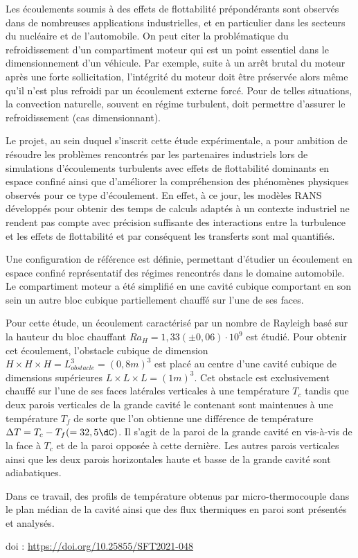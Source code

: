 {\normalsize
Les écoulements  soumis à des effets de flottabilité prépondérants sont observés dans de nombreuses applications industrielles, et en particulier dans les secteurs du nucléaire et de l'automobile. On peut citer la problématique du refroidissement d'un compartiment moteur qui est un point essentiel dans le dimensionnement d'un véhicule. Par exemple, suite à un arrêt brutal du moteur après une forte sollicitation, l'intégrité du moteur doit être préservée alors même qu'il n'est plus refroidi par un écoulement externe forcé. Pour de telles situations, la convection naturelle, souvent en régime turbulent, doit permettre d'assurer le refroidissement (cas dimensionnant).



Le projet, au sein duquel s'inscrit cette étude expérimentale, a pour ambition de résoudre les problèmes rencontrés par les partenaires industriels lors de simulations d'écoulements turbulents avec effets de flottabilité dominants en espace confiné ainsi que d'améliorer la compréhension des phénomènes physiques observés pour ce type d'écoulement. En effet, à ce jour, les modèles RANS développés pour obtenir des temps de calculs adaptés à un contexte industriel ne rendent pas compte avec précision suffisante des interactions entre la turbulence et les effets de flottabilité et par conséquent les transferts sont mal quantifiés.



Une configuration de référence est définie, permettant d'étudier un écoulement en espace confiné représentatif des régimes rencontrés dans le domaine automobile. Le compartiment moteur a été simplifié en une cavité cubique comportant en son sein un autre bloc cubique partiellement chauffé sur l'une de ses faces. 



Pour cette étude, un écoulement caractérisé par un nombre de Rayleigh basé sur la hauteur du bloc chauffant $Ra_H=1,33(\pm 0,06)\cdot 10^9$ est étudié. Pour obtenir cet écoulement, l'obstacle cubique de dimension $H\times H \times H=L_{obstacle}^3=(0,8 m)^3$ est placé au centre d'une cavité cubique de dimensions supérieures $L \times L \times L=(1 m)^3$. Cet obstacle est exclusivement chauffé sur l'une de ses faces latérales verticales à une température $\unit{T_c}$ tandis que deux parois verticales de la grande cavité le contenant sont maintenues à une température $\unit{T_f}$ de sorte que l'on obtienne une différence de température $\Delta T=T_c-T_f (=32,5\dC)$. Il s'agit de la paroi de la grande cavité en vis-à-vis de la face à $\unit{T_c}$ et de la paroi opposée à cette dernière. Les autres parois verticales ainsi que les deux parois horizontales haute et basse de la grande cavité sont adiabatiques.



Dans ce travail, des profils de température obtenus par micro-thermocouple dans le plan médian de la cavité ainsi que des flux thermiques en paroi sont présentés et analysés.

 \vfill doi : \url{https://doi.org/10.25855/SFT2021-048}

}
 
